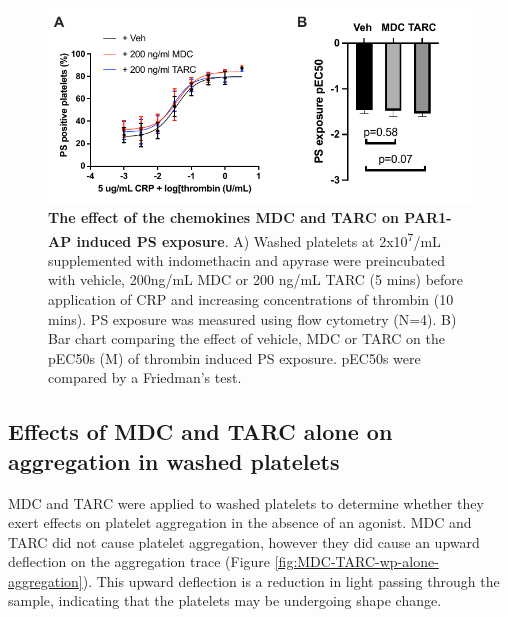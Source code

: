 \documentclass[11pt,twoside]{bristolthesis}
\begin{document}
\begin{figure}

{\centering \includegraphics{figure/Chemokines/Layouts/MDC_TARC_PS_exposure_layout} 

}

\caption[The effect of the chemokines MDC and TARC on PAR1-AP induced PS exposure]{\textbf{The effect of the chemokines MDC and TARC on PAR1-AP induced PS exposure}. A) Washed platelets at 2x10\textsuperscript{7}/mL supplemented with indomethacin and apyrase were preincubated with vehicle, 200ng/mL MDC or 200 ng/mL TARC (5 mins) before application of CRP and increasing concentrations of thrombin (10 mins). PS exposure was measured using flow cytometry (N=4). B) Bar chart comparing the effect of vehicle, MDC or TARC on the pEC50s (M) of thrombin induced PS exposure. pEC50s were compared by a Friedman's test.}\label{fig:MDC-TARC-PS-exposure}
\end{figure}
\hypertarget{effects-of-mdc-and-tarc-alone-on-aggregation-in-washed-platelets}{%
\subsection{Effects of MDC and TARC alone on aggregation in washed platelets}\label{effects-of-mdc-and-tarc-alone-on-aggregation-in-washed-platelets}}

MDC and TARC were applied to washed platelets to determine whether they exert effects on platelet aggregation in the absence of an agonist. MDC and TARC did not cause platelet aggregation, however they did cause an upward deflection on the aggregation trace (Figure \ref{fig:MDC-TARC-wp-alone-aggregation}). This upward deflection is a reduction in light passing through the sample, indicating that the platelets may be undergoing shape change.
\end{document}

